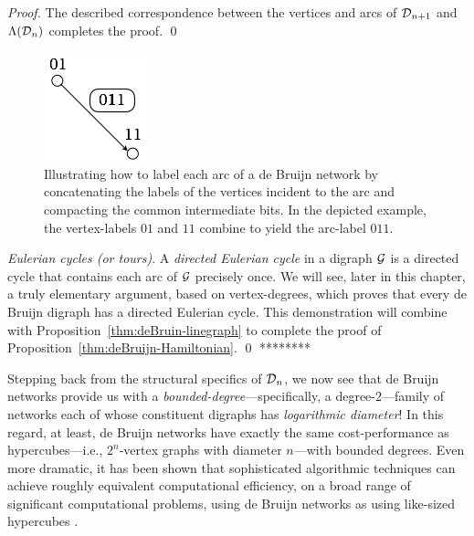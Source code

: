 {\begin{proof}
The described correspondence between the vertices and arcs of $\mbox{$\cal D$}_{n+1}$
and $\Lambda(\mbox{$\cal D$}_n)$ completes the proof.  \qed
\end{proof}

\begin{figure}[hbt]
\begin{center}
       \includegraphics[scale=0.6]{FiguresGraph/dBlabelEdge}
\caption{Illustrating how to label each arc of a de Bruijn network by
  concatenating the labels of the vertices incident to the arc and
  compacting the common intermediate bits.  In the depicted example,
  the vertex-labels $01$ and $11$ combine to yield the arc-label $011$.}
  \label{fig:dBlabelEdge}
\end{center}
\end{figure}

\medskip

{\it Eulerian cycles (or tours)}. 
 A {\it directed Eulerian cycle} in a digraph
$\mbox{$\cal G$}$ is a directed cycle that contains each arc of $\mbox{$\cal G$}$ precisely
once.  We will see, later in this chapter, a truly elementary
argument, based on vertex-degrees, which proves that every de Bruijn
digraph has a directed Eulerian cycle.  This demonstration will
combine with Proposition~\ref{thm:deBruin-linegraph} to complete the
proof of Proposition~\ref{thm:deBruijn-Hamiltonian}.  \qed
********}

\bigskip

Stepping back from the structural specifics of $\mbox{$\cal D$}_n$, we now see that de Bruijn networks
provide us with a {\em bounded-degree}---specifically, a degree-$2$---family of networks
each of whose constituent digraphs has {\em logarithmic diameter}!  In
this regard, at least, de Bruijn networks have exactly the same
cost-performance as hypercubes---i.e., $2^n$-vertex graphs with
diameter $n$---with bounded degrees.  Even more dramatic, it has been
shown that sophisticated algorithmic techniques can achieve roughly
equivalent computational efficiency, on a broad range of significant
computational problems, using de Bruijn networks as using like-sized
hypercubes \cite{AnnexsteinBR90, BermondP89, Ullman84}.
